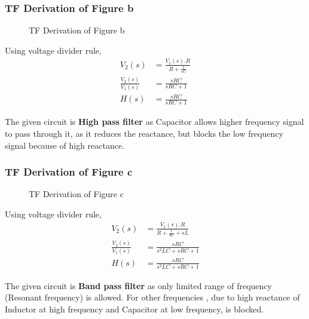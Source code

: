 \documentclass[a4paper,11pt]{article}
\begin{document}
\subsubsection{TF Derivation of Figure b}
\begin{figure}[H]
    \centering
    \figb \figbs
    \caption{TF Derivation of Figure b}
\end{figure}


Using voltage divider rule,
\begin{equation*}
    \begin{aligned}
        V_2(s)                & =\frac{V_1(s).R}{R+\frac{1}{sC}} \\
        \frac{V_2(s)}{V_1(s)} & =\frac{sRC}{sRC+1}               \\
        H(s)                  & =\frac{sRC}{sRC+1}
    \end{aligned}
\end{equation*}

The given circuit is \textbf{High pass filter} as Capacitor allows higher frequency signal to pass through it, as it reduces the reactance, but blocks the low frequency signal because of high reactance.


\subsubsection{TF Derivation of Figure c}
\begin{figure}[H]
    \centering
    \figc \figcs
    \caption{TF Derivation of Figure c}
\end{figure}

Using voltage divider rule,
\begin{equation*}
    \begin{aligned}
        V_2(s)                & =\frac{V_1(s).R}{R+\frac{1}{sC}+sL} \\
        \frac{V_2(s)}{V_1(s)} & =\frac{sRC}{s^2LC+sRC+1}            \\
        H(s)                  & =\frac{sRC}{s^2LC+sRC+1}
    \end{aligned}
\end{equation*}

The given circuit is \textbf{Band pass filter} as only limited range of frequency (Resonant frequency) is allowed. For other frequencies , due to high reactance of Inductor  at high frequency and Capacitor at low frequency,  is blocked.
\end{document}
